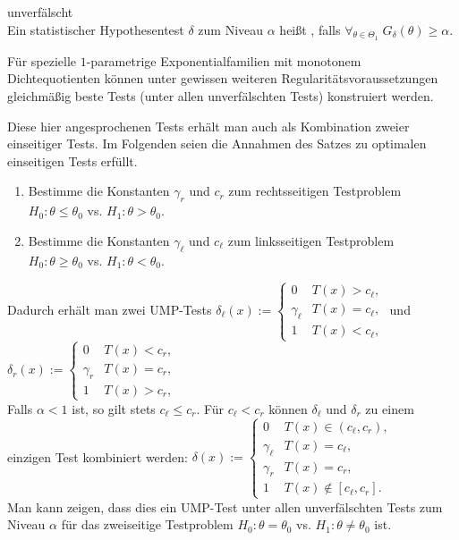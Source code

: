 \begin{Def}{unverfälscht}\\
    Ein statistischer Hypothesentest $\delta$ zum Niveau $\alpha$ heißt ,
    falls $\forall_{\theta \in \Theta_1}\; G_\delta(\theta) \ge \alpha$.
\end{Def}

\linie
\pagebreak

\begin{Bem}
    Für spezielle $1$-parametrige Exponentialfamilien mit monotonem Dichtequotienten können
    unter gewissen weiteren Regularitätsvoraussetzungen gleichmäßig beste Tests
    (unter allen unverfälschten Tests) konstruiert werden.
    
    
    Diese hier angesprochenen Tests erhält man auch als Kombination zweier einseitiger Tests.
    Im Folgenden seien die Annahmen des Satzes zu optimalen einseitigen Tests erfüllt.
    \begin{enumerate}[label=\arabic*.]
        \item
        Bestimme die Konstanten $\gamma_r$ und $c_r$ zum rechtsseitigen Testproblem\\
        $H_0\colon \theta \le \theta_0$ vs.
        $H_1\colon \theta > \theta_0$.
        
        \item
        Bestimme die Konstanten $\gamma_\ell$ und $c_\ell$ zum linksseitigen Testproblem\\
        $H_0\colon \theta \ge \theta_0$ vs.
        $H_1\colon \theta < \theta_0$.
    \end{enumerate}
    Dadurch erhält man zwei UMP-Tests
    $\delta_\ell(x) :=  \begin{cases}0 & T(x) > c_\ell,\\
    \gamma_\ell & T(x) = c_\ell,\\1 & T(x) < c_\ell,\end{cases}$
    und
    $\delta_r(x) :=  \begin{cases}0 & T(x) < c_r,\\
    \gamma_r & T(x) = c_r,\\1 & T(x) > c_r,\end{cases}$\\
    Falls $\alpha < 1$ ist, so gilt stets $c_\ell \le c_r$.
    Für $c_\ell < c_r$ können $\delta_\ell$ und $\delta_r$ zu einem einzigen Test kombiniert
    werden:
    $\delta(x) :=  \begin{cases}0 & T(x) \in (c_\ell, c_r),\\
    \gamma_\ell & T(x) = c_\ell,\\\gamma_r & T(x) = c_r,\\
    1 & T(x) \notin [c_\ell, c_r].\end{cases}$\\
    Man kann zeigen, dass dies ein UMP-Test unter allen unverfälschten Tests zum Niveau $\alpha$
    für das zweiseitige Testproblem $H_0\colon \theta = \theta_0$ vs.
    $H_1\colon \theta \not= \theta_0$ ist.
\end{Bem}

